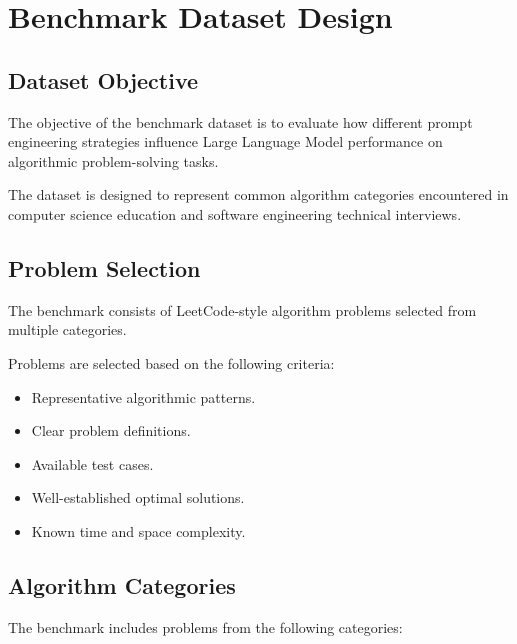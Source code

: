 \section{Benchmark Dataset Design}

\subsection{Dataset Objective}

The objective of the benchmark dataset is to evaluate how different prompt
engineering strategies influence Large Language Model performance on algorithmic
problem-solving tasks.

The dataset is designed to represent common algorithm categories encountered
in computer science education and software engineering technical interviews.


\subsection{Problem Selection}

The benchmark consists of LeetCode-style algorithm problems selected from
multiple categories.

Problems are selected based on the following criteria:

\begin{itemize}

\item Representative algorithmic patterns.

\item Clear problem definitions.

\item Available test cases.

\item Well-established optimal solutions.

\item Known time and space complexity.

\end{itemize}


\subsection{Algorithm Categories}

The benchmark includes problems from the following categories:

